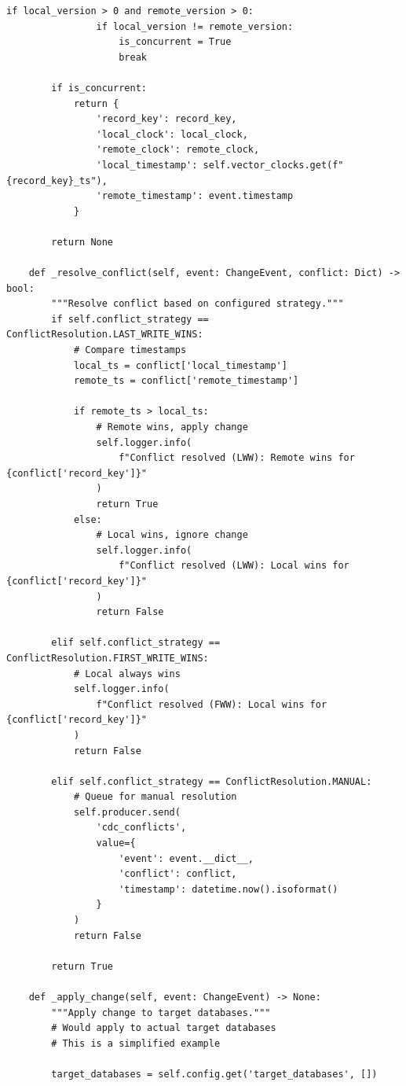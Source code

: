 \begin{lstlisting}[style=python, caption=CDCProcessor with Change Stream Handling]
            if local_version > 0 and remote_version > 0:
                if local_version != remote_version:
                    is_concurrent = True
                    break

        if is_concurrent:
            return {
                'record_key': record_key,
                'local_clock': local_clock,
                'remote_clock': remote_clock,
                'local_timestamp': self.vector_clocks.get(f"{record_key}_ts"),
                'remote_timestamp': event.timestamp
            }

        return None

    def _resolve_conflict(self, event: ChangeEvent, conflict: Dict) -> bool:
        """Resolve conflict based on configured strategy."""
        if self.conflict_strategy == ConflictResolution.LAST_WRITE_WINS:
            # Compare timestamps
            local_ts = conflict['local_timestamp']
            remote_ts = conflict['remote_timestamp']

            if remote_ts > local_ts:
                # Remote wins, apply change
                self.logger.info(
                    f"Conflict resolved (LWW): Remote wins for {conflict['record_key']}"
                )
                return True
            else:
                # Local wins, ignore change
                self.logger.info(
                    f"Conflict resolved (LWW): Local wins for {conflict['record_key']}"
                )
                return False

        elif self.conflict_strategy == ConflictResolution.FIRST_WRITE_WINS:
            # Local always wins
            self.logger.info(
                f"Conflict resolved (FWW): Local wins for {conflict['record_key']}"
            )
            return False

        elif self.conflict_strategy == ConflictResolution.MANUAL:
            # Queue for manual resolution
            self.producer.send(
                'cdc_conflicts',
                value={
                    'event': event.__dict__,
                    'conflict': conflict,
                    'timestamp': datetime.now().isoformat()
                }
            )
            return False

        return True

    def _apply_change(self, event: ChangeEvent) -> None:
        """Apply change to target databases."""
        # Would apply to actual target databases
        # This is a simplified example

        target_databases = self.config.get('target_databases', [])


\end{lstlisting}
